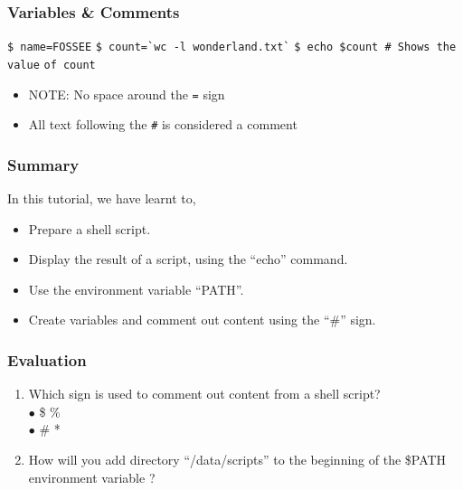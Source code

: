 \documentclass[17pt,compress]{beamer}
\begin{document}
\begin{frame}[fragile]
  \frametitle{Variables \& Comments}
  \verb~$ name=FOSSEE~
  \verb~$ count=`wc -l wonderland.txt`~
  \verb~$ echo $count # Shows the value~
  \verb~of count~
  \begin{itemize}
  \item \alert{NOTE:} No space around the \texttt{=} sign
  \item All text following the \texttt{\#} is considered a comment
  \end{itemize}
\end{frame}

\begin{frame}
\frametitle{Summary}
\label{sec-8}

  In this tutorial, we have learnt to,


\begin{itemize}
\item Prepare a shell script.
\item Display the result of a script, using the ``echo'' command.
\item Use the environment variable ``PATH''.
\item Create variables and comment out content using the ``\#'' sign.
\end{itemize}
\end{frame}

\begin{frame}[fragile]
\frametitle{Evaluation}
\label{sec-9}


\begin{enumerate}
\item Which sign is used to comment out content from a shell script?\\
{\color{LimeGreen}$\bullet$} \$ \hspace{80pt}{\color{LimeGreen}$\bullet$} \% \\
{\color{LimeGreen}$\bullet$} \# \hspace{80pt}{\color{LimeGreen}$\bullet$} * \\
\vspace{8pt}
\item How will you add directory ``/data/scripts'' to the beginning of 
    the \$PATH environment variable ?
\end{enumerate}
\end{frame}

\end{document}
